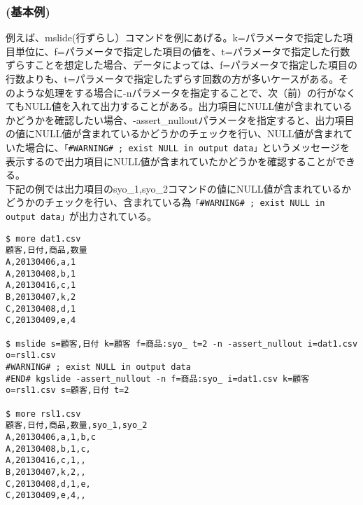 \subsubsection*{(基本例) }
例えば、mslide(行ずらし）コマンドを例にあげる。k=パラメータで指定した項目単位に、f=パラメータで指定した項目の値を、t=パラメータで指定した行数ずらすことを想定した場合、データによっては、f=パラメータで指定した項目の行数よりも、t=パラメータで指定したずらす回数の方が多いケースがある。そのような処理をする場合に-nパラメータを指定することで、次（前）の行がなくてもNULL値を入れて出力することがある。出力項目にNULL値が含まれているかどうかを確認したい場合、-assert\_nulloutパラメータを指定すると、出力項目の値にNULL値が含まれているかどうかのチェックを行い、NULL値が含まれていた場合に、\verb|「#WARNING# ; exist NULL in output data」|というメッセージを表示するので出力項目にNULL値が含まれていたかどうかを確認することができる。\\ 下記の例では出力項目のsyo\_1,syo\_2コマンドの値にNULL値が含まれているかどうかのチェックを行い、含まれている為\verb|「#WARNING# ; exist NULL in output data」|が出力されている。

\begin{Verbatim}[baselinestretch=0.7,frame=single]
$ more dat1.csv
顧客,日付,商品,数量
A,20130406,a,1
A,20130408,b,1
A,20130416,c,1
B,20130407,k,2
C,20130408,d,1
C,20130409,e,4

$ mslide s=顧客,日付 k=顧客 f=商品:syo_ t=2 -n -assert_nullout i=dat1.csv  o=rsl1.csv
#WARNING# ; exist NULL in output data
#END# kgslide -assert_nullout -n f=商品:syo_ i=dat1.csv k=顧客 o=rsl1.csv s=顧客,日付 t=2

$ more rsl1.csv
顧客,日付,商品,数量,syo_1,syo_2
A,20130406,a,1,b,c
A,20130408,b,1,c,
A,20130416,c,1,,
B,20130407,k,2,,
C,20130408,d,1,e,
C,20130409,e,4,,
\end{Verbatim}
